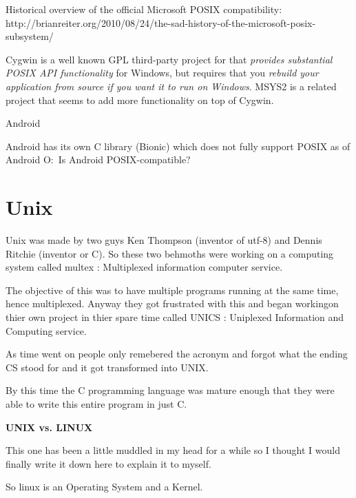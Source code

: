 Historical overview of the official Microsoft POSIX compatibility: http://brianreiter.org/2010/08/24/the-sad-history-of-the-microsoft-posix-subsystem/

Cygwin is a well known GPL third-party project for that \textit{provides
	substantial POSIX API functionality} for Windows, but requires that you
\textit{rebuild your application from source if you want it to run on Windows}. MSYS2
is a related project that seems to add more functionality on top of Cygwin.

Android

Android has its own C library (Bionic) which does not fully support POSIX as of
Android O:\ Is Android POSIX-compatible?

\subsectionend




\sectionend

\section{{Unix}}
\label{sec:unix}

Unix was made by two guys Ken Thompson (inventor of utf-8) and Dennis Ritchie
(inventor or C). So these two behmoths were working on a computing system
called multex : Multiplexed information computer service.



The objective of this was to have multiple programs running at the same time,
hence multiplexed. Anyway they got frustrated with this and began workingon
thier own project in thier spare time called UNICS : Uniplexed Information and
Computing service.



As time went on people only remebered the acronym and forgot what the ending CS
stood for and it got transformed into UNIX.\



By this time the C programming language was mature enough that they were able to
write this entire program in just C.



\textbf{UNIX vs. LINUX}

This one has been a little muddled in my head for a while so I thought I would
finally write it down here to explain it to myself.



So linux is an Operating System and a Kernel.

